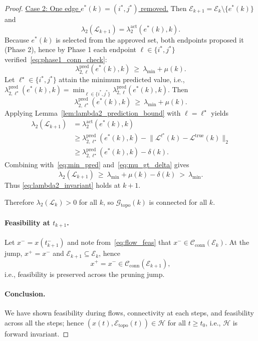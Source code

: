 \documentclass[conference]{IEEEconf}
\theoremstyle{plain}
\begin{document}
\begin{proof}
\smallskip
\noindent\underline{Case 2: One edge $e^*(k)=(i^*,j^*)$ removed.}
Then $\mathcal{E}_{k+1}=\mathcal{E}_k\setminus\{e^*(k)\}$ and
\[
\lambda_2(\mathcal{L}_{k+1})=\lambda_2^{\mathrm{act}}(e^*(k),k).
\]
Because $e^*(k)$ is selected from the approved set, both endpoints proposed it (Phase 2),
hence by Phase 1 each endpoint $\ell\in\{i^*,j^*\}$ verified~\eqref{eq:phase1_conn_check}:
\[
\lambda_{2,\ell}^{\mathrm{pred}}(e^*(k),k)\ \ge\ \lambda_{\min}+\mu(k).
\]
Let $\ell^\star\in\{i^*,j^*\}$ attain the minimum predicted value, i.e.,
$\lambda_{2,\ell^\star}^{\mathrm{pred}}(e^*(k),k)=\min_{\ell\in\{i^*,j^*\}}\lambda_{2,\ell}^{\mathrm{pred}}(e^*(k),k)$.
Then
\begin{equation}
\lambda_{2,\ell^\star}^{\mathrm{pred}}(e^*(k),k)\ \ge\ \lambda_{\min}+\mu(k).
\label{eq:min_pred}
\end{equation}
Applying Lemma~\ref{lem:lambda2_prediction_bound} with $\ell=\ell^\star$ yields
\begin{align}
\lambda_2(\mathcal{L}_{k+1})
&=\lambda_{2}^{\mathrm{act}}(e^*(k),k) \nonumber\\
&\ge
\lambda_{2,\ell^\star}^{\mathrm{pred}}(e^*(k),k)
-\big\|\mathcal{L}^{\ell^\star}(k)-\mathcal{L}^{\mathrm{true}}(k)\big\|_2
\nonumber\\
&\ge
\lambda_{2,\ell^\star}^{\mathrm{pred}}(e^*(k),k)-\delta(k).
\label{eq:lambda2_chain}
\end{align}
Combining with~\eqref{eq:min_pred} and~\eqref{eq:mu_gt_delta} gives
\[
\lambda_2(\mathcal{L}_{k+1})
\ \ge\ \lambda_{\min}+\mu(k)-\delta(k)\ >\ \lambda_{\min}.
\]
Thus \eqref{eq:lambda2_invariant} holds at $k+1$.

\smallskip
Therefore $\lambda_2(\mathcal{L}_k)>0$ for all $k$,
so $\mathcal{G}_{\mathrm{topo}}(k)$ is connected for all $k$.

\paragraph{Feasibility at $t_{k+1}$.}
Let $x^- = x(t_{k+1}^-)$ and note from~\eqref{eq:flow_feas} that $x^-\in\mathcal{C}_{\mathrm{conn}}(\mathcal{E}_k)$.
At the jump, $x^+=x^-$ and $\mathcal{E}_{k+1}\subseteq\mathcal{E}_k$, hence
\[
x^+=x^-\in \mathcal{C}_{\mathrm{conn}}(\mathcal{E}_{k+1}),
\]
i.e., feasibility is preserved across the pruning jump.

\paragraph{Conclusion.}
We have shown feasibility during flows, connectivity at each steps, and feasibility across all the steps; hence
$(x(t),\mathcal{E}_{\mathrm{topo}}(t))\in\mathcal{H}$ for all $t\ge t_0$, i.e., $\mathcal{H}$ is forward invariant.
\end{proof}
\end{document}
